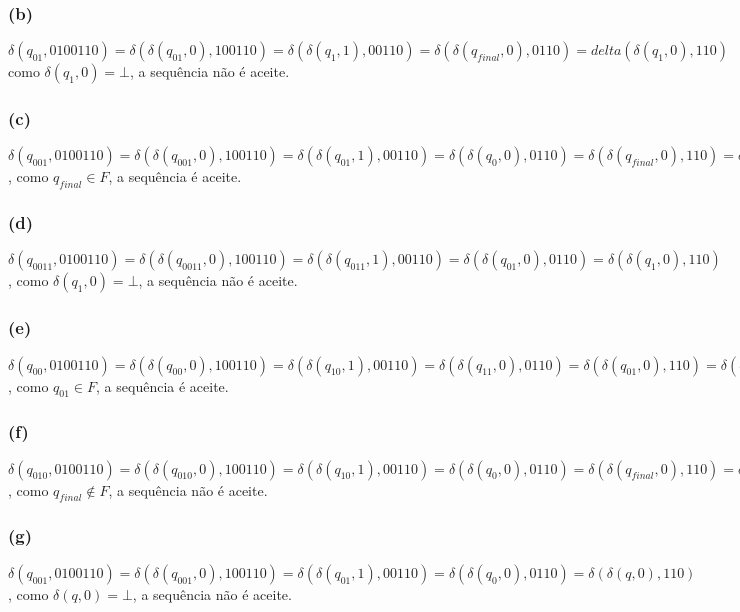 \documentclass{article}
\begin{document}
\subsubsection*{(b)}
$\delta(q_{01}, 0100110) = \delta(\delta(q_{01}, 0), 100110) = \delta(\delta(q_{1}, 1), 00110) = \delta(\delta(q_{final}, 0), 0110) = delta(\delta(q_{1}, 0), 110)$ como $ \delta(q_{1}, 0) = \bot$, a sequência não é aceite.

\subsubsection*{(c)}
$\delta(q_{001}, 0100110) = \delta(\delta(q_{001}, 0), 100110) = \delta(\delta(q_{01}, 1), 00110) = \delta(\delta(q_{0}, 0), 0110) = \delta(\delta(q_{final}, 0), 110) = \delta(\delta(q_{final}, 1), 10) = \delta(\delta(q_{final}, 1), 0) =
  \delta(q_{final}, 0) = q_{final}$, como $q_{final} \in F$, a sequência é aceite.

\subsubsection*{(d)}
$\delta(q_{0011}, 0100110) = \delta(\delta(q_{0011}, 0), 100110) = \delta(\delta(q_{011}, 1), 00110) = \delta(\delta(q_{01}, 0), 0110) = \delta(\delta(q_{1}, 0), 110)$, como $\delta(q_{1}, 0) = \bot$, a sequência não é aceite.

\subsubsection*{(e)}
$\delta(q_{00}, 0100110) = \delta(\delta(q_{00}, 0), 100110) = \delta(\delta(q_{10}, 1), 00110) = \delta(\delta(q_{11}, 0), 0110) = \delta(\delta(q_{01}, 0), 110) = \delta(\delta(q_{11}, 1), 10) = \delta(\delta(q_{10}, 1), 0) = \delta(q_{11}, 0) = q_{01}$, como $q_{01} \in F$, a sequência é aceite.

\subsubsection*{(f)}
$\delta(q_{010}, 0100110) = \delta(\delta(q_{010}, 0), 100110) = \delta(\delta(q_{10}, 1), 00110) = \delta(\delta(q_{0}, 0), 0110) = \delta(\delta(q_{final}, 0), 110) = \delta(\delta(q_{final}, 1), 10) = \delta(\delta(q_{final}, 1), 0) = \delta(q_{final}, 1) = q_{final}$, como $q_{final} \notin F$, a sequência não é aceite.

\subsubsection*{(g)}
$\delta(q_{001}, 0100110) = \delta(\delta(q_{001}, 0), 100110) = \delta(\delta(q_{01}, 1), 00110) = \delta(\delta(q_{0}, 0), 0110) = \delta(\delta(q, 0), 110)$, como $\delta(q, 0) = \bot$, a sequência não é aceite.
\end{document}
